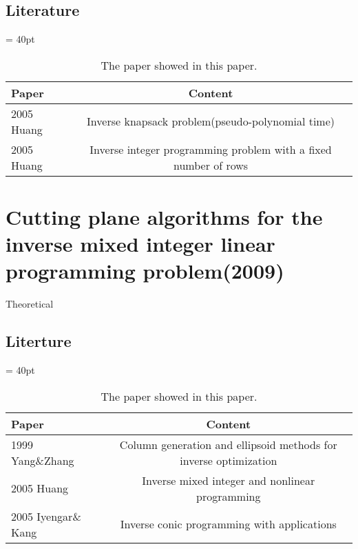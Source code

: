 \documentclass[UTF8]{article}
\begin{document}
\subsection{Literature}


\begin{table}[ht]

\tabcolsep = 40pt

\small\renewcommand{}

\caption{The paper showed in this paper.\label{tab:7}}

{\begin{tabular}{lc}
\hline
Paper & Content \\
\hline
2005 Huang & Inverse knapsack problem(pseudo-polynomial time)     \\
\hline
2005 Huang & Inverse integer programming problem with a fixed number of rows \\
\hline

\end{tabular}}
{}
\end{table}




\section{Cutting plane algorithms for the inverse mixed integer linear programming problem(2009)}

Theoretical


\subsection{Literture}


\begin{table}[ht]

\tabcolsep = 40pt

\small\renewcommand{}

\caption{The paper showed in this paper.\label{tab:8}}

{\begin{tabular}{lc}
\hline
Paper & Content \\
\hline
1999 Yang\&Zhang  & Column generation and ellipsoid methods for inverse optimization \\
\hline
2005 Huang & Inverse mixed integer and nonlinear programming  \\
\hline
2005 Iyengar\& Kang & Inverse conic programming with applications \\
\hline

\end{tabular}}
{}
\end{table}
\end{document}
